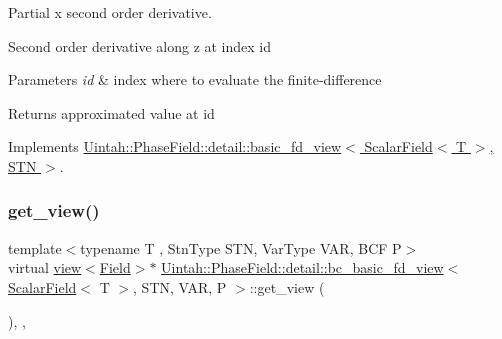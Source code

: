 Partial x second order derivative. 

Second order derivative along z at index id


\begin{DoxyParams}{Parameters}
{\em id} & index where to evaluate the finite-\/difference \\
\hline
\end{DoxyParams}
\begin{DoxyReturn}{Returns}
approximated value at id 
\end{DoxyReturn}


Implements \hyperlink{classUintah_1_1PhaseField_1_1detail_1_1basic__fd__view_3_01ScalarField_3_01T_01_4_00_01STN_01_4_a6a9141dd1b9b547eba1bd7ff0440b6bf}{Uintah\+::\+Phase\+Field\+::detail\+::basic\+\_\+fd\+\_\+view$<$ Scalar\+Field$<$ T $>$, S\+T\+N $>$}.

\mbox{\label{classUintah_1_1PhaseField_1_1detail_1_1bc__basic__fd__view_3_01ScalarField_3_01T_01_4_00_01STN_00_01VAR_00_01P_01_4_a46e6a2a932a522c1ed93c7c28d728e83}} 
\subsubsection{\texorpdfstring{get\+\_\+view()}{get\_view()}\hspace{0.1cm}{\footnotesize\ttfamily [1/2]}}
{\footnotesize\ttfamily template$<$typename T , Stn\+Type S\+TN, Var\+Type V\+AR, B\+CF P$>$ \\
virtual \hyperlink{classUintah_1_1PhaseField_1_1detail_1_1view}{view}$<$\hyperlink{structUintah_1_1PhaseField_1_1ScalarField}{Field}$>$$\ast$ \hyperlink{classUintah_1_1PhaseField_1_1detail_1_1bc__basic__fd__view}{Uintah\+::\+Phase\+Field\+::detail\+::bc\+\_\+basic\+\_\+fd\+\_\+view}$<$ \hyperlink{structUintah_1_1PhaseField_1_1ScalarField}{Scalar\+Field}$<$ T $>$, S\+TN, V\+AR, P $>$\+::get\+\_\+view (\begin{DoxyParamCaption}{ }\end{DoxyParamCaption})\hspace{0.3cm}{\ttfamily [inline]}, {\ttfamily [override]}, {\ttfamily [virtual]}}



